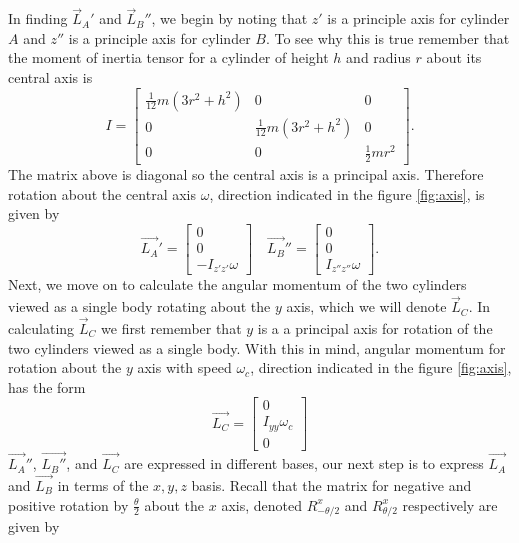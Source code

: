 \documentclass[12]{amsart}
\theoremstyle{definition}
\begin{document}
\par In finding $\vec{L}_A'$ and $\vec{L}_B''$, we begin by noting that $z'$ is a principle axis for cylinder $A$ and $z''$ is a principle axis for cylinder $B$. To see why this is true remember that the moment of inertia tensor for a cylinder of height $h$ and radius $r$ about its central axis is  
\begin{equation*}
I=
\begin{bmatrix}
\frac{1}{12} m(3r^2+h^2) & 0 & 0 \\
0 & \frac{1}{12} m(3r^2+h^2) & 0 \\
0 & 0 & \frac{1}{2} mr^2
\end{bmatrix}.
\end{equation*}
The matrix above is diagonal so the central axis is a principal axis. Therefore rotation about the central axis $\omega$, direction indicated in the figure \ref{fig:axis}, is given by 
\begin{equation*}
    \vec{L_A}' = 
    \begin{bmatrix}
    0\\
    0\\
    -I_{z' z'}\omega
    \end{bmatrix}
    \quad
    \vec{L_B}'' = 
    \begin{bmatrix}
    0\\
    0\\
    I_{z'' z''}\omega
    \end{bmatrix}.
\end{equation*}
Next, we move on to calculate the angular momentum of the two cylinders viewed as a single body rotating about the $y$ axis, which we will denote $\vec{L}_C$. In calculating $\vec{L}_C$ we first remember that $y$ is a a principal axis for rotation of the two cylinders viewed as a single body. With this in mind, angular momentum for rotation about the $y$ axis with speed $\omega_c$, direction indicated in the figure \ref{fig:axis}, has the form
\begin{equation*}
     \vec{L_C} = 
    \begin{bmatrix}
    0\\
    I_{y y}\omega_c\\
    0
    \end{bmatrix}
\end{equation*}
$\vec{L_A}''$, $\vec{L_B''}$, and $\vec{L_C}$ are expressed in different bases, our next step is to express $\vec{L_A}$ and $\vec{L_B}$ in terms of the $x,y,z$ basis. Recall that the matrix for negative and positive rotation by $\frac{\theta}{2}$ about the $x$ axis, denoted $R_{-\theta/2}^x$ and $R_{\theta/2}^x$ respectively are given by
\end{document}
